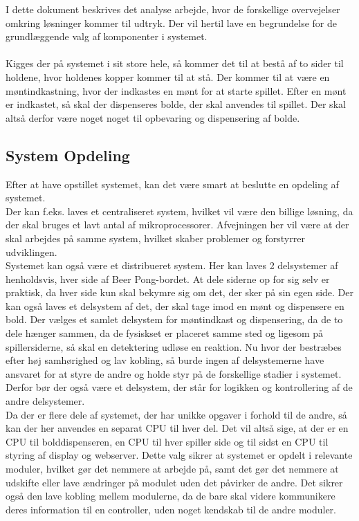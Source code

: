 \documentclass[a4paper,12pt,fleqn,oneside]{article}
\begin{document}

\tableofcontents
\newpage
I dette dokument beskrives det analyse arbejde, hvor de forskellige overvejelser omkring løsninger kommer til udtryk. Der vil hertil lave en begrundelse for de grundlæggende valg af komponenter i systemet. \\\\
Kigges der på systemet i sit store hele, så kommer det til at bestå af to sider til holdene, hvor holdenes kopper kommer til at stå. Der kommer til at være en møntindkastning, hvor der indkastes en mønt for at starte spillet. Efter en mønt er indkastet, så skal der dispenseres bolde, der skal anvendes til spillet. Der skal altså derfor være noget noget til opbevaring og dispensering af bolde.\\ 
\subsection{System Opdeling}\label{sec:sys_opdeling}
Efter at have opstillet systemet, kan det være smart at beslutte en opdeling af systemet.\\
Der kan f.eks. laves et centraliseret system, hvilket vil være den billige løsning, da der skal bruges et lavt antal af mikroprocessorer. Afvejningen her vil være at der skal arbejdes på samme system, hvilket skaber problemer og forstyrrer udviklingen.\\
Systemet kan også være et distribueret system. Her kan laves 2 delsystemer af henholdsvis, hver side af Beer Pong-bordet. At dele siderne op for sig selv er praktisk, da hver side kun skal bekymre sig om det, der sker på sin egen side. Der kan også laves et delsystem af det, der skal tage imod en mønt og dispensere en bold. Der vælges et samlet delsystem for møntindkast og dispensering, da de to dele hænger sammen, da de fysiskset er placeret samme sted og ligesom på spillersiderne, så skal en detektering udløse en reaktion. Nu hvor der bestræbes efter høj samhørighed og lav kobling, så burde ingen af delsystemerne have ansvaret for at styre de andre og holde styr på de forskellige stadier i systemet. Derfor bør der også være et delsystem, der står for logikken og kontrollering af de andre delsystemer.\\
Da der er flere dele af systemet, der har unikke opgaver i forhold til de andre, så kan der her anvendes en separat CPU til hver del. Det vil altså sige, at der er en CPU til bolddispenseren, en CPU til hver spiller side og til sidst en CPU til styring af display og webserver. Dette valg sikrer at systemet er opdelt i relevante moduler, hvilket gør det nemmere at arbejde på, samt det gør det nemmere at udskifte eller lave ændringer på modulet uden det påvirker de andre. Det sikrer også den lave kobling mellem modulerne, da de bare skal videre kommunikere deres information til en controller, uden noget kendskab til de andre moduler.
\end{document}
